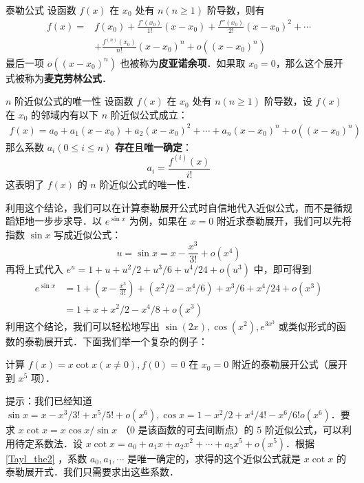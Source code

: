 
\begin{theorem}{泰勒公式}\label{Tayl_the1}
设函数 $f(x)$ 在 $x_0$ 处有 $n(n\ge 1)$ 阶导数，则有
\begin{equation}
\begin{aligned}
f(x)=&f(x_0)+\frac{f'(x_0)}{1!}(x-x_0)+\frac{f''(x_0)}{2!}(x-x_0)^2+\cdots\\
&+\frac{f^{(n)}(x_0)}{n!}(x-x_0)^n+o((x-x_0)^n)
\end{aligned}
\end{equation}
最后一项 $o((x-x_0)^n)$ 也被称为\textbf{皮亚诺余项}．如果取 $x_0=0$，那么这个展开式被称为\textbf{麦克劳林公式}．
\end{theorem}
\begin{theorem}{$n$ 阶近似公式的唯一性}\label{Tayl_the2}
设函数 $f(x)$ 在 $x_0$ 处有 $n(n\ge 1)$ 阶导数，设 $f(x)$ 在 $x_0$ 的邻域内有以下 $n$ 阶近似公式成立：
\begin{equation}
\begin{aligned}
f(x)=a_0+a_1(x-x_0)+a_2(x-x_0)^2+\cdots+a_n(x-x_0)^n+o((x-x_0)^n)
\end{aligned}
\end{equation}
那么系数 $a_i(0\le i\le n)$ \textbf{存在}且\textbf{唯一确定}：
\begin{equation}
a_i=\frac{f^{(i)}(x)}{i!}
\end{equation}
这表明了 $f(x)$ 的 $n$ 阶近似公式的唯一性．
\end{theorem}
利用这个结论，我们可以在计算泰勒展开公式时自信地代入近似公式，而不是循规蹈矩地一步步求导．以 $e^{\sin x}$ 为例，如果在 $x=0$ 附近求泰勒展开，我们可以先将指数 $\sin x$ 写成近似公式：
\begin{equation}
u=\sin x=x-\frac{x^3}{3!}+o(x^4)
\end{equation}
再将上式代入 $e^u=1+u+u^2/2+u^3/6+u^4/24+o(u^3)$ 中，即可得到
\begin{equation}
\begin{aligned}
e^{\sin x}&=1+(x-\frac{x^3}{3!})+(x^2/2-x^4/6)+x^3/6+x^4/24+o(x^3)
\\&=1+x+x^2/2-x^4/8+o(x^3)
\end{aligned}
\end{equation}
利用这个结论，我们可以轻松地写出 $\sin (2x),\cos(x^2),e^{3x^3}$ 或类似形式的函数的泰勒展开式．下面我们举一个复杂的例子：
\begin{exercise}{}
计算 $f(x)=x\cot x(x\neq 0),f(0)=0$ 在 $x_0=0$ 附近的泰勒展开公式（展开到 $x^5$ 项）．
\end{exercise}
提示：我们已经知道 $\sin x=x-x^3/3!+x^5/5!+o(x^6),\cos x=1-x^2/2+x^4/4!-x^6/6!o(x^6)$．要求 $x\cot x=x\cos x/\sin x$ （$0$ 是该函数的可去间断点）的 $5$ 阶近似公式，可以利用待定系数法．设 $x\cot x=a_0+a_1 x+a_2 x^2+\cdots+ a_5 x^5 + o(x^5)$．根据 \autoref{Tayl_the2}  ，系数 $a_0,a_1,\cdots$ 是唯一确定的，求得的这个近似公式就是 $x\cot x$ 的泰勒展开式．我们只需要求出这些系数．

